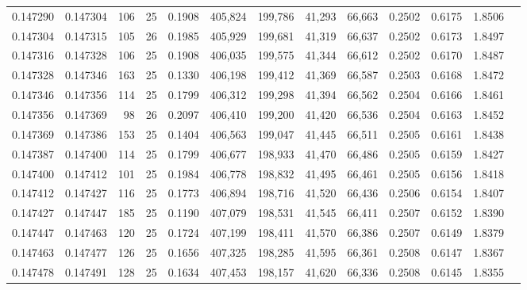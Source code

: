 \begin{tabular}{rrrrrrrrrrrrr}
0.147290 & 0.147304 &   106 &  25 &                                     0.1908 & 405,824 & 199,786 &  41,293 &  66,663 & 0.2502 & 0.6175 & 1.8506 \\
0.147304 & 0.147315 &   105 &  26 &                                     0.1985 & 405,929 & 199,681 &  41,319 &  66,637 & 0.2502 & 0.6173 & 1.8497 \\
0.147316 & 0.147328 &   106 &  25 &                                     0.1908 & 406,035 & 199,575 &  41,344 &  66,612 & 0.2502 & 0.6170 & 1.8487 \\
0.147328 & 0.147346 &   163 &  25 &                                     0.1330 & 406,198 & 199,412 &  41,369 &  66,587 & 0.2503 & 0.6168 & 1.8472 \\
0.147346 & 0.147356 &   114 &  25 &                                     0.1799 & 406,312 & 199,298 &  41,394 &  66,562 & 0.2504 & 0.6166 & 1.8461 \\
0.147356 & 0.147369 &    98 &  26 &                                     0.2097 & 406,410 & 199,200 &  41,420 &  66,536 & 0.2504 & 0.6163 & 1.8452 \\
0.147369 & 0.147386 &   153 &  25 &                                     0.1404 & 406,563 & 199,047 &  41,445 &  66,511 & 0.2505 & 0.6161 & 1.8438 \\
0.147387 & 0.147400 &   114 &  25 &                                     0.1799 & 406,677 & 198,933 &  41,470 &  66,486 & 0.2505 & 0.6159 & 1.8427 \\
0.147400 & 0.147412 &   101 &  25 &                                     0.1984 & 406,778 & 198,832 &  41,495 &  66,461 & 0.2505 & 0.6156 & 1.8418 \\
0.147412 & 0.147427 &   116 &  25 &                                     0.1773 & 406,894 & 198,716 &  41,520 &  66,436 & 0.2506 & 0.6154 & 1.8407 \\
0.147427 & 0.147447 &   185 &  25 &                                     0.1190 & 407,079 & 198,531 &  41,545 &  66,411 & 0.2507 & 0.6152 & 1.8390 \\
0.147447 & 0.147463 &   120 &  25 &                                     0.1724 & 407,199 & 198,411 &  41,570 &  66,386 & 0.2507 & 0.6149 & 1.8379 \\
0.147463 & 0.147477 &   126 &  25 &                                     0.1656 & 407,325 & 198,285 &  41,595 &  66,361 & 0.2508 & 0.6147 & 1.8367 \\
0.147478 & 0.147491 &   128 &  25 &                                     0.1634 & 407,453 & 198,157 &  41,620 &  66,336 & 0.2508 & 0.6145 & 1.8355 \\

\end{tabular}
